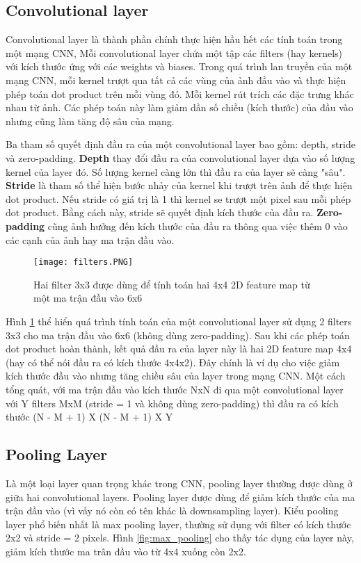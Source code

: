 \subsection*{Convolutional layer}
Convolutional layer là thành phần chính thực hiện hầu hết các tính toán trong một mạng CNN, Mỗi convolutional layer chứa một tập các filters (hay kernels) với kích thước ứng với các weights và biases. Trong quá trình lan truyền của một mạng CNN, mỗi kernel trượt qua tất cả các vùng của ảnh đầu vào và thực hiện phép toán dot product trên mỗi vùng đó. Mỗi kernel rút trích các đặc trưng khác nhau từ ảnh. Các phép toán này làm giảm dần số chiều (kích thước) của đầu vào nhưng cũng làm tăng độ sâu của mạng.

Ba tham số quyết định đầu ra của một convolutional layer bao gồm: depth, stride và zero-padding. \textbf{Depth} thay đổi đầu ra của convolutional layer dựa vào số lượng kernel của layer đó. Số lượng kernel càng lớn thì đầu ra của layer sẽ càng "sâu". \textbf{Stride} là tham số thể hiện bước nhảy của kernel khi trượt trên ảnh để thực hiện dot product. Nếu stride có giá trị là 1 thì kernel se trượt một pixel sau mỗi phép dot product. Bằng cách này, stride sẽ quyết định kích thước của đầu ra. \textbf{Zero-padding} cũng ảnh hưởng đến kích thước của đầu ra thông qua việc thêm 0 vào các cạnh của ảnh hay ma trận đầu vào. 

\begin{figure}[h!]
	\centering
	\captionsetup{width=0.7\textwidth}
	\texttt{[image: filters.PNG]}
	\caption{Hai filter 3x3 được dùng để tính toán hai 4x4 2D feature map từ một ma trận đầu vào 6x6}
    \label{fig:filters}
\end{figure}

Hình \ref{fig:filters} thể hiển quá trình tính toán của một convolutional layer sử dụng 2 filters 3x3 cho ma trận đầu vào 6x6 (không dùng zero-padding). Sau khi các phép toán dot product hoàn thành, kết quả đầu ra của layer này là hai 2D feature map 4x4 (hay có thể nói đầu ra có kích thước 4x4x2). Đây chính là ví dụ cho việc giảm kích thước đầu vào nhưng tăng chiều sâu của layer trong mạng CNN. Một cách tổng quát, với ma trận đầu vào kích thước NxN đi qua một convolutional layer với Y filters MxM (stride = 1 và không dùng zero-padding) thì đầu ra có kích thước (N - M + 1) X (N - M + 1) X Y

\subsection*{Pooling Layer}
Là một loại layer quan trọng khác trong CNN, pooling layer thường được dùng ở giữa hai convolutional layers. Pooling layer được dùng để giảm kích thước của ma trận đầu vào (vì vấy nó còn có tên khác là downsampling layer). Kiểu pooling layer phổ biến nhất là max pooling layer, thường sử dụng với filter có kích thước 2x2 và stride = 2 pixels. Hình \ref{fig:max_pooling} cho thấy tác dụng của layer này, giảm kích thước ma trân đầu vào từ 4x4 xuống còn 2x2.

